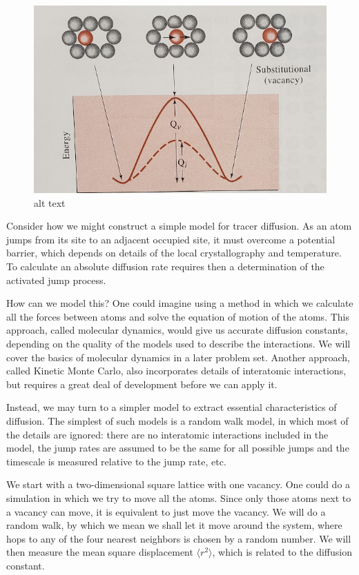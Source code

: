 \documentclass[11pt]{article}
\begin{document}
\begin{figure}
\centering
\includegraphics{figs/diffusion.png}
\caption{alt text}
\end{figure}

Consider how we might construct a simple model for tracer diffusion. As
an atom jumps from its site to an adjacent occupied site, it must
overcome a potential barrier, which depends on details of the local
crystallography and temperature. To calculate an absolute diffusion rate
requires then a determination of the activated jump process.

How can we model this? One could imagine using a method in which we
calculate all the forces between atoms and solve the equation of motion
of the atoms. This approach, called molecular dynamics, would give us
accurate diﬀusion constants, depending on the quality of the models used
to describe the interactions. We will cover the basics of molecular
dynamics in a later problem set. Another approach, called Kinetic Monte
Carlo, also incorporates details of interatomic interactions, but
requires a great deal of development before we can apply it.

Instead, we may turn to a simpler model to extract essential
characteristics of diffusion. The simplest of such models is a random
walk model, in which most of the details are ignored: there are no
interatomic interactions included in the model, the jump rates are
assumed to be the same for all possible jumps and the timescale is
measured relative to the jump rate, etc.

We start with a two-dimensional square lattice with one vacancy. One
could do a simulation in which we try to move all the atoms. Since only
those atoms next to a vacancy can move, it is equivalent to just move
the vacancy. We will do a random walk, by which we mean we shall let it
move around the system, where hops to any of the four nearest neighbors
is chosen by a random number. We will then measure the mean square
displacement $\langle r^2 \rangle$, which is related to the diﬀusion
constant.
\end{document}
